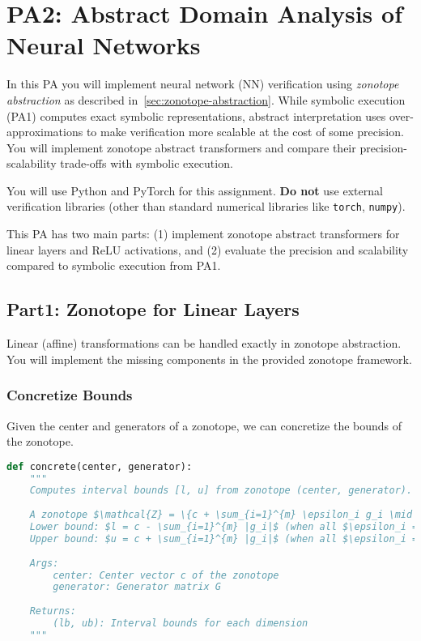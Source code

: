 \section{PA2: Abstract Domain Analysis of Neural Networks}\label{sec:pa2}

In this PA you will implement neural network (NN) verification using \emph{zonotope abstraction} as described in~\autoref{sec:zonotope-abstraction}. While symbolic execution (PA1) computes exact symbolic representations, abstract interpretation uses over-approximations to make verification more scalable at the cost of some precision. You will implement zonotope abstract transformers and compare their precision-scalability trade-offs with symbolic execution.

You will use Python and PyTorch for this assignment. \textbf{Do not} use external verification libraries (other than standard numerical libraries like \texttt{torch}, \texttt{numpy}).

This PA has two main parts: (1) implement zonotope abstract transformers for linear layers and ReLU activations, and (2) evaluate the precision and scalability compared to symbolic execution from PA1.


\subsection{Part1: Zonotope for Linear Layers}

Linear (affine) transformations can be handled exactly in zonotope abstraction. You will implement the missing components in the provided zonotope framework.

\subsubsection{Concretize Bounds}
Given the center and generators of a zonotope, we can concretize the bounds of the zonotope.
\begin{lstlisting}[language=Python]
def concrete(center, generator):
    """
    Computes interval bounds [l, u] from zonotope (center, generator).
    
    A zonotope $\mathcal{Z} = \{c + \sum_{i=1}^{m} \epsilon_i g_i \mid \epsilon_i \in [-1,1]\}$ can be converted to interval bounds:
    Lower bound: $l = c - \sum_{i=1}^{m} |g_i|$ (when all $\epsilon_i = -\text{sign}(g_i)$)
    Upper bound: $u = c + \sum_{i=1}^{m} |g_i|$ (when all $\epsilon_i = +\text{sign}(g_i)$)
    
    Args:
        center: Center vector c of the zonotope
        generator: Generator matrix G 
        
    Returns:
        (lb, ub): Interval bounds for each dimension
    """
\end{lstlisting}

